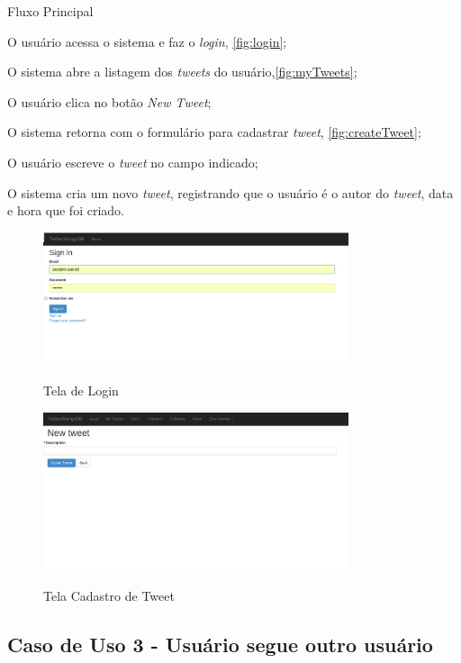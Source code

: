Fluxo Principal
\begin{enumerate}
{\setlength\itemindent{25pt}
\item O usuário acessa o sistema e faz o \textit{login}, \autoref{fig:login};
\item O sistema abre a listagem dos \textit{tweets} do usuário,\autoref{fig:myTweets};
\item O usuário clica no botão \textit{New Tweet};
\item O sistema retorna com o formulário para cadastrar \textit{tweet}, \autoref{fig:createTweet};
\item O usuário escreve o \textit{tweet} no campo indicado;
\item O sistema cria um novo \textit{tweet}, registrando que o usuário é o autor do \textit{tweet}, data e hora que foi criado.
}
\end{enumerate}
\begin{figure}[H]
    \centering
    \caption{Tela de Login}
    \includegraphics[width=0.8\textwidth]{./04-figuras/login.png}
    \label{fig:login}
\end{figure}
\begin{figure}[H]
    \centering
    \caption{Tela Cadastro de Tweet}
    \includegraphics[width=0.8\textwidth]{./04-figuras/createTweet.png}
    \label{fig:createTweet}
\end{figure}


\subsection{Caso de Uso 3 - Usuário segue outro usuário}
\label{subsec:useCaseUserFollow}

